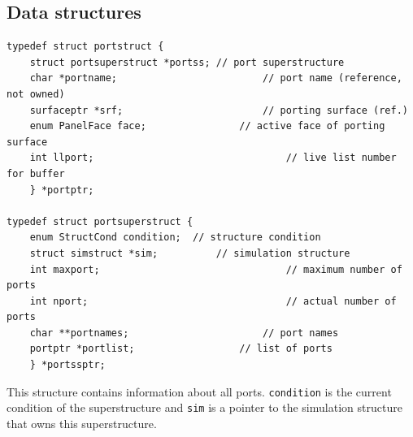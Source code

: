 \documentclass {scrbook}
\newcommand {\ttt} {\texttt}
\begin{document}
\subsection{Data structures}

\begin{lstlisting}
typedef struct portstruct {
	struct portsuperstruct *portss;	// port superstructure
	char *portname;							// port name (reference, not owned)
	surfaceptr *srf;						// porting surface (ref.)
	enum PanelFace face;				// active face of porting surface
	int llport;									// live list number for buffer
	} *portptr;

typedef struct portsuperstruct {
	enum StructCond condition;	// structure condition
	struct simstruct *sim;			// simulation structure
	int maxport;								// maximum number of ports
	int nport;									// actual number of ports
	char **portnames;						// port names
	portptr *portlist;					// list of ports
	} *portssptr;
\end{lstlisting}

This structure contains information about all ports. \ttt{condition} is the current condition of the superstructure and \ttt{sim} is a pointer to the simulation structure that owns this superstructure.
\end{document}
